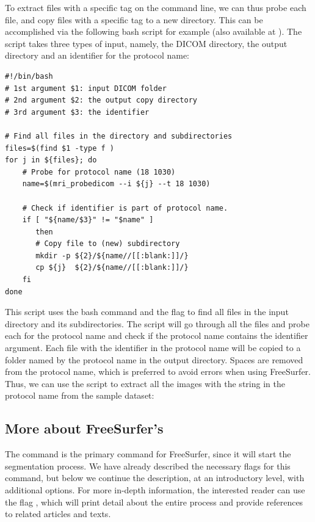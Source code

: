 To extract files with a specific tag on the command line, we can thus
probe each file, and copy files with a specific tag to a new
directory. This can be accomplished via the following bash script for example
(also available at ). The script
takes three types of input, namely, the DICOM directory, the output directory and
an identifier for the protocol name:
\begin{lstlisting}[style=bashStyle]
#!/bin/bash
# 1st argument $1: input DICOM folder
# 2nd argument $2: the output copy directory
# 3rd argument $3: the identifier 

# Find all files in the directory and subdirectories
files=$(find $1 -type f ) 
for j in ${files}; do
    # Probe for protocol name (18 1030)
    name=$(mri_probedicom --i ${j} --t 18 1030) 

    # Check if identifier is part of protocol name.
    if [ "${name/$3}" != "$name" ]
       then
       # Copy file to (new) subdirectory 
       mkdir -p ${2}/${name//[[:blank:]]/}  
       cp ${j}  ${2}/${name//[[:blank:]]/} 
    fi
done
\end{lstlisting}

This script uses the bash command  and the flag  to find all files in the input directory and its
subdirectories. The script will go through all the files and probe
each for the protocol name and check if the protocol name
contains the identifier argument. Each file with the identifier in the
protocol name will be copied to a folder named by the protocol name in
the output directory. Spaces are removed from the protocol name, which is preferred to avoid errors when using FreeSurfer.
Thus, we can use the script to extract all the images with the 
string in the protocol name from the sample dataset:

\subsection{More about FreeSurfer's }
\label{sec:chp3:advanced:recon-all}
%
%
The command  is the primary command for FreeSurfer,
since it will start the segmentation process. We have already
described the necessary flags for this command, but below we continue
the description, at an introductory level, with additional
options. For more in-depth information, the interested reader can use
the flag , which will print detail about the
entire process and provide references to related articles and texts.

